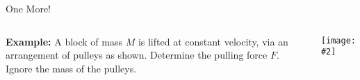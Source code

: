 \documentclass[12pt,compress,aspectratio=169]{beamer}
\newcommand{\pic}[2]{\texttt{[image: \#2]}}
\begin{document}
\begin{frame}{One More!}
  \begin{columns}
    \textbf{Example:} A block of mass $M$ is lifted at constant velocity, via
    an arrangement of pulleys as shown. Determine the pulling force $F$. Ignore
    the mass of the pulleys. 

    
    \pic{1}{graphics/pulley_prob_9.png}
  \end{columns}
\end{frame}


%
\end{document}
